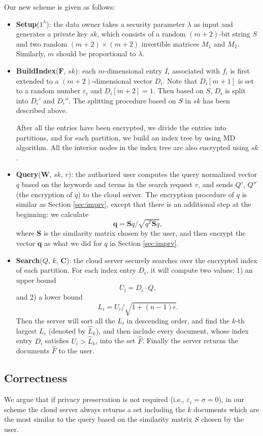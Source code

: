 \documentclass{IEEEtran}
\begin{document}
Our new scheme is given as follows:
\begin{itemize}
\item \textbf{Setup}($1^\lambda$): the data owner takes a security parameter $\lambda$ as input and generates a private key $sk$, which consists of a random $(m+2)$-bit string $S$ and two random $(m+2)\times (m+2)$ invertible matrices $M_1$ and $M_2$. Similarly, $m$ should be proportional to $\lambda$.
\item \textbf{BuildIndex}($\mathbf{F}$, $sk$): each $m$-dimensional entry $I_i$ associated with $f_i$ is first extended to a $(m+2)$-dimensional vector $D_i$. Note that $D_i[m+1]$ is set to a random number $\varepsilon_i$ and $D_i[m+2]=1$. Then based on $S$, $D_i$ is split into $D_i'$ and $D_i''$. The splitting procedure based on $S$ in $sk$ has been described above. 

After all the entries have been encrypted, we divide the entries into partitions, and for each partition, we build an index tree by using MD algorithm. All the interior nodes in the index tree are also encrypted using $sk$.
\item \textbf{Query}($\mathbf{W}$, $sk$, $r$): the authorized user computes the query normalized vector $q$ based on the keywords and terms in the search request $r$, and sends $Q'$, $Q''$ (the encryption of $q$) to the cloud server. The encryption procedure of $q$ is similar as Section \ref{sec:imprv}, except that there is an additional step at the beginning: we calculate 
$$\mathbf{q} = \mathbf{S}q/\sqrt{q^T\mathbf{S}q},$$ 
where $\mathbf{S}$ is the similarity matrix chosen by the user, and then encrypt the vector $\mathbf{q}$ as what we did for $q$ in Section \ref{sec:imprv}.
\item \textbf{Search}($Q$, $k$, $\mathbf{C}$): the cloud server securely searches over the encrypted index of each partition. 
For each index entry $D_i$, it will compute two values: 1) an upper bound 
$$U_i = D_i\cdot Q,$$ 
and 2) a lower bound 
$$L_i = U_i / \sqrt{1+(n-1)\epsilon}.$$
Then the server will sort all the $L_i$ in descending order, and find the $k$-th largest $L_i$ (denoted by $\hat{L}_k$), and then include every document, whose index entry $D_i$ satisfies $U_i > \hat{L}_k$, into the set $\hat{F}$. 
Finally the server returns the documents $\hat{F}$ to the user.
\end{itemize}

\subsection{Correctness}
We argue that if privacy preservation is not required (i.e., $\varepsilon_i = \sigma = 0$), in our scheme the cloud server always returns a set including the $k$ documents which are the most similar to the query based on the similarity matrix $S$ chosen by the user.
\end{document}
